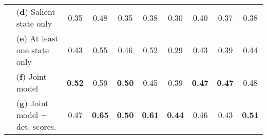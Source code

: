 \begin{table*}[t!]
{\begin{tabular}{clccccccc|c}
			& (\textbf{d}) Salient state only                       & 0.35          & 0.48          & 0.35          & 0.38          & 0.30          & 0.40          & 0.37          & 0.38                                          \\
			
			& (\textbf{e}) At least one state only                  & 0.43 & 0.55 & 0.46          & 0.52          & 0.29          & 0.43          & 0.39          & 0.44                                          \\
			
			
			
			& (\textbf{f}) Joint model                              & \textbf{0.52}          & 0.59          & \textbf{0.50} & 0.45 & 0.39          & \textbf{0.47} & \textbf{0.47} & 0.48                                 \\
			
			&(\textbf{g}) Joint model + det. scores.                                             & 0.47          & \textbf{0.65}          & \textbf{0.50}          & \textbf{0.61}        & \textbf{0.44}          & 0.46          & 0.43          & \textbf{0.51}                                         \\ \cline{2-10} 
			

\end{tabular}}
\end{table*}
